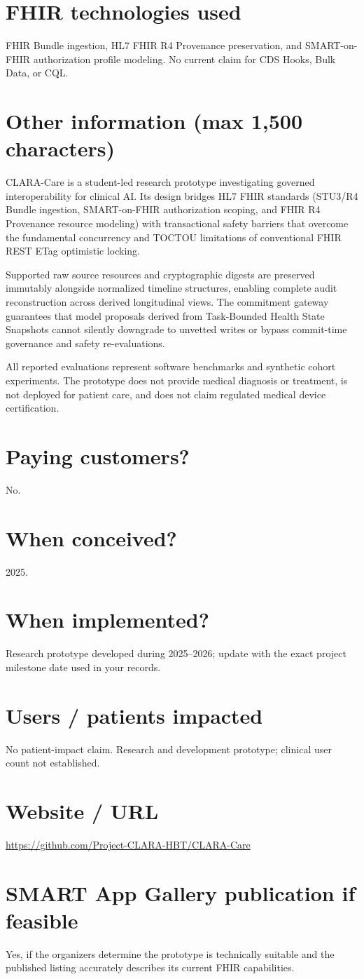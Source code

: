 \documentclass[10pt,letterpaper]{article}
\begin{document}
\section{FHIR technologies used}
FHIR Bundle ingestion, HL7 FHIR R4 Provenance preservation, and SMART-on-FHIR authorization profile modeling. No current claim for CDS Hooks, Bulk Data, or CQL.

\section{Other information (max 1,500 characters)}
CLARA-Care is a student-led research prototype investigating governed interoperability for clinical AI. Its design bridges HL7 FHIR standards (STU3/R4 Bundle ingestion, SMART-on-FHIR authorization scoping, and FHIR R4 Provenance resource modeling) with transactional safety barriers that overcome the fundamental concurrency and TOCTOU limitations of conventional FHIR REST ETag optimistic locking.

Supported raw source resources and cryptographic digests are preserved immutably alongside normalized timeline structures, enabling complete audit reconstruction across derived longitudinal views. The commitment gateway guarantees that model proposals derived from Task-Bounded Health State Snapshots cannot silently downgrade to unvetted writes or bypass commit-time governance and safety re-evaluations.

All reported evaluations represent software benchmarks and synthetic cohort experiments. The prototype does not provide medical diagnosis or treatment, is not deployed for patient care, and does not claim regulated medical device certification.

\section{Paying customers?}
No.

\section{When conceived?}
2025.

\section{When implemented?}
Research prototype developed during 2025--2026; update with the exact project milestone date used in your records.

\section{Users / patients impacted}
No patient-impact claim. Research and development prototype; clinical user count not established.

\section{Website / URL}
\url{https://github.com/Project-CLARA-HBT/CLARA-Care}

\section{SMART App Gallery publication if feasible}
Yes, if the organizers determine the prototype is technically suitable and the published listing accurately describes its current FHIR capabilities.
\end{document}
